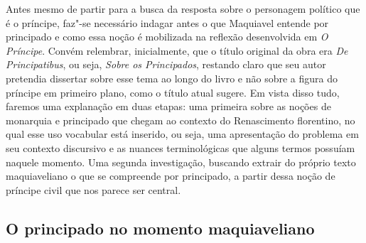 Antes mesmo de partir para a busca da resposta sobre o personagem
político que é o príncipe, faz"-se necessário indagar antes o que
Maquiavel entende por principado e como essa noção é mobilizada na
reflexão desenvolvida em \emph{O Príncipe}. Convém relembrar,
inicialmente, que o título original da obra era \emph{De Principatibus},
ou seja, \emph{Sobre os Principados}, restando claro que seu autor
pretendia dissertar sobre esse tema ao longo do livro e não sobre a
figura do príncipe em primeiro plano, como o título atual sugere. Em
vista disso tudo, faremos uma explanação em duas etapas: uma primeira
sobre as noções de monarquia e principado que chegam ao contexto do
Renascimento florentino, no qual esse uso vocabular está inserido, ou
seja, uma apresentação do problema em seu contexto discursivo e as
nuances terminológicas que alguns termos possuíam naquele momento. Uma
segunda investigação, buscando extrair do próprio texto maquiaveliano o
que se compreende por principado, a partir dessa noção de príncipe civil
que nos parece ser central.

\subsection{O principado no momento maquiaveliano}

